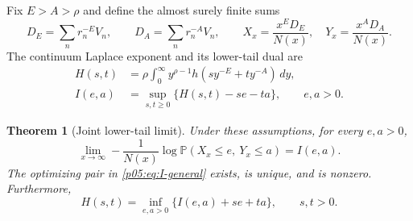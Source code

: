 \documentclass[11pt,letterpaper]{article}
\newtheorem{theorem}{Theorem}[section]
\theoremstyle{definition}
\theoremstyle{remark}
\newcommand{\1}{\mathbf 1}
\begin{document}
Fix $E>A>\rho$ and define the almost surely finite sums
\[
 D_E=\sum_n r_n^{-E}V_n,\qquad D_A=\sum_n r_n^{-A}V_n,
 \qquad X_x=\frac{x^E D_E}{N(x)},\quad Y_x=\frac{x^A D_A}{N(x)}.
\]
The continuum Laplace exponent and its lower-tail dual are
\begin{align}
 H(s,t)&=\rho\int_0^\infty y^{\rho-1}
 h(sy^{-E}+ty^{-A})\,dy,\label{p05:eq:H-general}\\
 I(e,a)&=\sup_{s,t\ge0}\{H(s,t)-se-ta\},\qquad e,a>0.
 \label{p05:eq:I-general}
\end{align}

\begin{theorem}[Joint lower-tail limit]\label{p05:thm:rv-ldp}
Under these assumptions, for every $e,a>0$,
\[
 \lim_{x\to\infty}-\frac{1}{N(x)}
 \log\mathbb P(X_x\le e,\ Y_x\le a)=I(e,a).
\]
The optimizing pair in \eqref{p05:eq:I-general} exists, is unique, and is
nonzero. Furthermore,
\begin{equation}\label{p05:eq:duality-recover}
 H(s,t)=\inf_{e,a>0}\{I(e,a)+se+ta\},\qquad s,t>0.
\end{equation}
\end{theorem}
\end{document}
